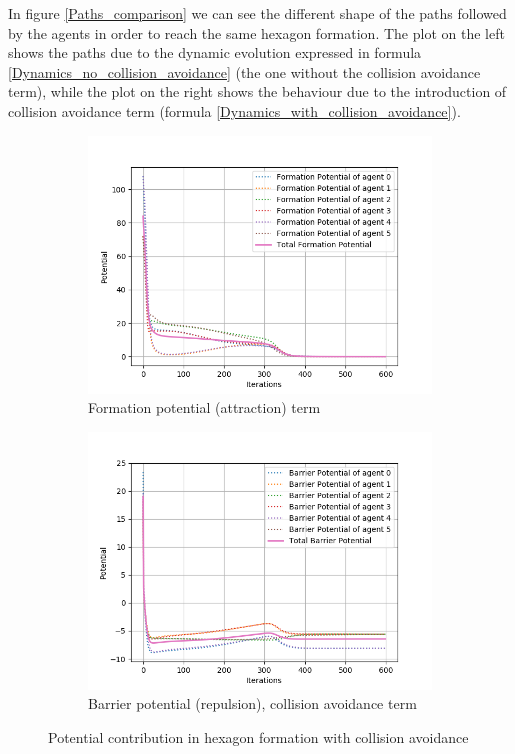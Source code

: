 \documentclass[a4paper,11pt,oneside]{book}
\begin{document}
In figure \ref{Paths_comparison} we can see the different shape of the paths followed by the agents in order to reach the same hexagon formation. The plot on the left shows the paths due to the dynamic evolution expressed in formula \ref{Dynamics_no_collision_avoidance} (the one without the collision avoidance term), while the plot on the right shows the behaviour due to the introduction of collision avoidance term (formula \ref{Dynamics_with_collision_avoidance}).

\begin{figure}
\centering
	\begin{subfigure}{0.49\textwidth}	
	\includegraphics[scale=0.42]{Formation_potential_hexagon_collision}
	\caption{Formation potential (attraction) term}
	\end{subfigure}
\hfill
	\begin{subfigure}{0.49\textwidth}	
	\includegraphics[scale=0.42]{Barrier_potential_hexagon_collision}
	\caption{Barrier potential (repulsion), collision avoidance term}
	\end{subfigure}
\caption{Potential contribution in hexagon formation with collision avoidance}
\label{Potentials_with_collision}
\end{figure}
\end{document}

